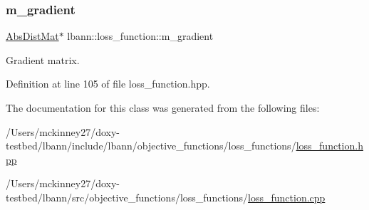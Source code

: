 \subsubsection{\texorpdfstring{m\+\_\+gradient}{m\_gradient}}
{\footnotesize\ttfamily \hyperlink{base_8hpp_a9a697a504ae84010e7439ffec862b470}{Abs\+Dist\+Mat}$\ast$ lbann\+::loss\+\_\+function\+::m\+\_\+gradient\hspace{0.3cm}{\ttfamily [protected]}}

Gradient matrix. 

Definition at line 105 of file loss\+\_\+function.\+hpp.



The documentation for this class was generated from the following files\+:\begin{DoxyCompactItemize}
\item 
/\+Users/mckinney27/doxy-\/testbed/lbann/include/lbann/objective\+\_\+functions/loss\+\_\+functions/\hyperlink{loss__function_8hpp}{loss\+\_\+function.\+hpp}\item 
/\+Users/mckinney27/doxy-\/testbed/lbann/src/objective\+\_\+functions/loss\+\_\+functions/\hyperlink{loss__function_8cpp}{loss\+\_\+function.\+cpp}\end{DoxyCompactItemize}
